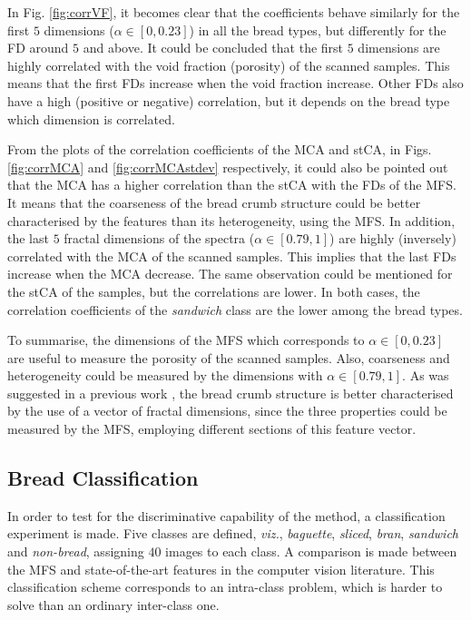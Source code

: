 \documentclass[twocolumn]{bmcart}%
\begin{document}
In Fig. \ref{fig:corrVF}, it becomes clear that the coefficients behave similarly for the first $5$ dimensions ($\alpha \in [0,0.23]$) in all the bread types, but differently for the FD around $5$ and above. It could be concluded that the first $5$ dimensions are highly correlated with the void fraction (porosity) of the scanned samples. This means that the first FDs increase when the void fraction increase. Other FDs also have a high (positive or negative) correlation, but it depends on the bread type which dimension is correlated.

From the plots of the correlation coefficients of the MCA and stCA, in Figs. \ref{fig:corrMCA} and \ref{fig:corrMCAstdev} respectively, it could also be pointed out that the MCA has a higher correlation than the stCA with the FDs of the MFS. It means that the coarseness of the bread crumb structure could be better characterised by the features than its heterogeneity, using the MFS. In addition, the last $5$ fractal dimensions of the spectra ($\alpha \in [0.79,1]$) are highly (inversely) correlated with the MCA of the scanned samples. This implies that the last FDs increase when the MCA decrease. The same observation could be mentioned for the stCA of the samples, but the correlations are lower. In both cases, the correlation coefficients of the {\em sandwich} class are the lower among the bread types.

To summarise, the dimensions of the MFS which corresponds to $\alpha \in [0,0.23]$ are useful to measure the porosity of the scanned samples. Also, coarseness and heterogeneity could be measured by the dimensions with $\alpha \in [0.79,1]$. As was suggested in a previous work \cite{Gonzales2008}, the bread crumb structure is better characterised by the use of a vector of fractal dimensions, since the three properties could be measured by the MFS, employing different sections of this feature vector.

\subsection{Bread Classification}
\label{sec:10}

In order to test for the discriminative capability of the method, a classification experiment is made. Five classes are defined, {\em viz.}, {\em baguette}, {\em sliced}, {\em bran}, {\em sandwich} and {\em non-bread}, assigning $40$ images to each class. A comparison is made between the MFS and state-of-the-art features in the computer vision literature. This classification scheme corresponds to an intra-class problem, which is harder to solve than an ordinary inter-class one. 
\end{document}

